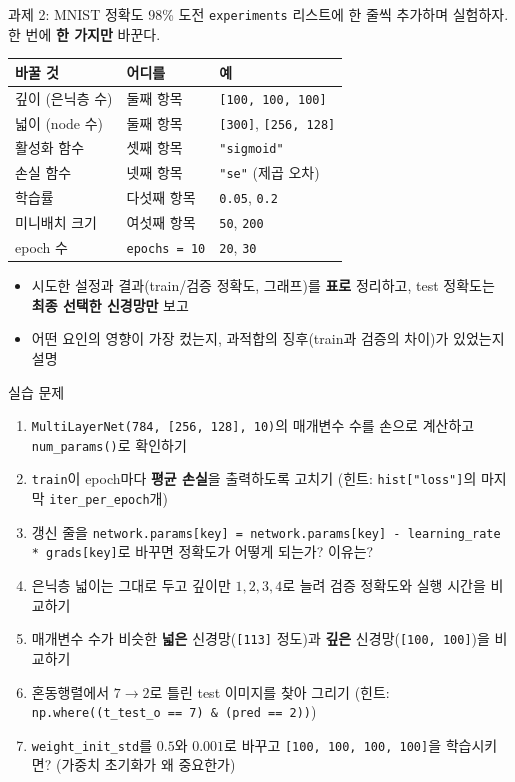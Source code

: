 \documentclass[aspectratio=169,11pt]{beamer}
\newcommand{\code}[1]{\texttt{#1}}
\begin{document}
\begin{frame}{과제 2: MNIST 정확도 98\% 도전}
\small
\code{experiments} 리스트에 한 줄씩 추가하며 실험하자. 한 번에 \textbf{한 가지만} 바꾼다.
\vskip1mm
\centering
\footnotesize
\renewcommand{\arraystretch}{1.15}
\begin{tabular}{lll}
\toprule
\textbf{바꿀 것} & \textbf{어디를} & \textbf{예} \\
\midrule
깊이 (은닉층 수) & 둘째 항목 & \code{[100, 100, 100]} \\
넓이 (node 수) & 둘째 항목 & \code{[300]}, \code{[256, 128]} \\
활성화 함수 & 셋째 항목 & \code{"sigmoid"} \\
손실 함수 & 넷째 항목 & \code{"se"} (제곱 오차) \\
학습률 & 다섯째 항목 & \code{0.05}, \code{0.2} \\
미니배치 크기 & 여섯째 항목 & \code{50}, \code{200} \\
epoch 수 & \code{epochs = 10} & \code{20}, \code{30} \\
\bottomrule
\end{tabular}
\raggedright
\small
\begin{itemize}
\item 시도한 설정과 결과(train/검증 정확도, 그래프)를 \textbf{표로} 정리하고, test 정확도는 \textbf{최종 선택한 신경망만} 보고
\item 어떤 요인의 영향이 가장 컸는지, 과적합의 징후(train과 검증의 차이)가 있었는지 설명
\end{itemize}
\end{frame}

\begin{frame}{실습 문제}
\small
\begin{enumerate}
\item \code{MultiLayerNet(784, [256, 128], 10)}의 매개변수 수를 손으로 계산하고 \code{num\_params()}로 확인하기
\item \code{train}이 epoch마다 \textbf{평균 손실}을 출력하도록 고치기 (힌트: \code{hist["loss"]}의 마지막 \code{iter\_per\_epoch}개)
\item 갱신 줄을 \code{network.params[key] = network.params[key] - learning\_rate * grads[key]}로 바꾸면 정확도가 어떻게 되는가? 이유는?
\item 은닉층 넓이는 그대로 두고 깊이만 $1, 2, 3, 4$로 늘려 검증 정확도와 실행 시간을 비교하기
\item 매개변수 수가 비슷한 \textbf{넓은} 신경망(\code{[113]} 정도)과 \textbf{깊은} 신경망(\code{[100, 100]})을 비교하기
\item 혼동행렬에서 $7\to2$로 틀린 test 이미지를 찾아 그리기 (힌트: \code{np.where((t\_test\_o == 7) \& (pred == 2))})
\item \code{weight\_init\_std}를 $0.5$와 $0.001$로 바꾸고 \code{[100, 100, 100, 100]}을 학습시키면? (가중치 초기화가 왜 중요한가)
\end{enumerate}
\end{frame}
\end{document}
